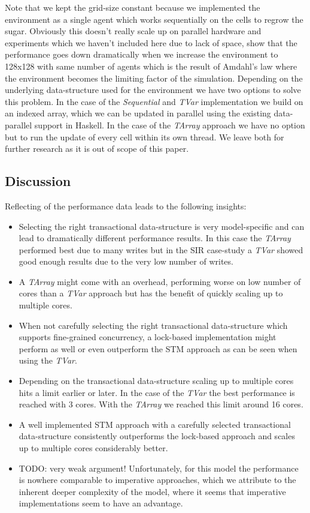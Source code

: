 Note that we kept the grid-size constant because we implemented the environment as a single agent which works sequentially on the cells to regrow the sugar. Obviously this doesn't really scale up on parallel hardware and experiments which we haven't included here due to lack of space, show that the performance goes down dramatically when we increase the environment to 128x128 with same number of agents which is the result of Amdahl's law where the environment becomes the limiting factor of the simulation. Depending on the underlying data-structure used for the environment we have two options to solve this problem. In the case of the \textit{Sequential} and \textit{TVar} implementation we build on an indexed array, which we can be updated in parallel using the existing data-parallel support in Haskell. In the case of the \textit{TArray} approach we have no option but to run the update of every cell within its own thread. We leave both for further research as it is out of scope of this paper.

\subsection{Discussion}
Reflecting of the performance data leads to the following insights:
\begin{itemize}	
	\item Selecting the right transactional data-structure is very model-specific and can lead to dramatically different performance results. In this case the \textit{TArray} performed best due to many writes but in the SIR case-study a \textit{TVar} showed good enough results due to the very low number of writes.
	\item A \textit{TArray} might come with an overhead, performing worse on low number of cores than a \textit{TVar} approach but has the benefit of quickly scaling up to multiple cores.
	\item When not carefully selecting the right transactional data-structure which supports fine-grained concurrency, a lock-based implementation might perform as well or even outperform the STM approach as can be seen when using the \textit{TVar}.
	\item Depending on the transactional data-structure scaling up to multiple cores hits a limit earlier or later. In the case of the \textit{TVar} the best performance is reached with 3 cores. With the \textit{TArray} we reached this limit around 16 cores.
	\item A well implemented STM approach with a carefully selected transactional data-structure consistently outperforms the lock-based approach and scales up to multiple cores considerably better.
	\item TODO: very weak argument! Unfortunately, for this model the performance is nowhere comparable to imperative approaches, which we attribute to the inherent deeper complexity of the model, where it seems that imperative implementations seem to have an advantage.
\end{itemize}